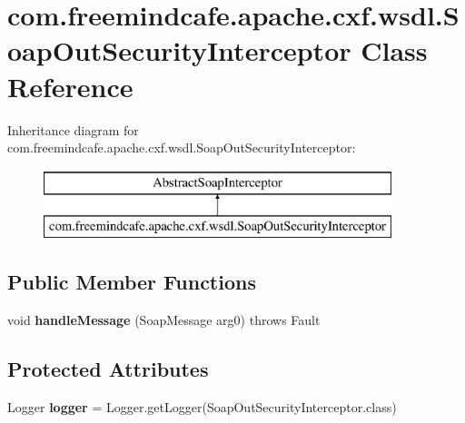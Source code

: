 \hypertarget{classcom_1_1freemindcafe_1_1apache_1_1cxf_1_1wsdl_1_1_soap_out_security_interceptor}{}\section{com.\+freemindcafe.\+apache.\+cxf.\+wsdl.\+Soap\+Out\+Security\+Interceptor Class Reference}
\label{classcom_1_1freemindcafe_1_1apache_1_1cxf_1_1wsdl_1_1_soap_out_security_interceptor}
Inheritance diagram for com.\+freemindcafe.\+apache.\+cxf.\+wsdl.\+Soap\+Out\+Security\+Interceptor\+:\begin{figure}[H]
\begin{center}
\leavevmode
\includegraphics[height=2.000000cm]{classcom_1_1freemindcafe_1_1apache_1_1cxf_1_1wsdl_1_1_soap_out_security_interceptor}
\end{center}
\end{figure}
\subsection*{Public Member Functions}
\begin{DoxyCompactItemize}
\item 
\hypertarget{classcom_1_1freemindcafe_1_1apache_1_1cxf_1_1wsdl_1_1_soap_out_security_interceptor_aa170f13104a26169f22a6dc425e2ca5d}{}void {\bfseries handle\+Message} (Soap\+Message arg0)  throws Fault \label{classcom_1_1freemindcafe_1_1apache_1_1cxf_1_1wsdl_1_1_soap_out_security_interceptor_aa170f13104a26169f22a6dc425e2ca5d}

\end{DoxyCompactItemize}
\subsection*{Protected Attributes}
\begin{DoxyCompactItemize}
\item 
\hypertarget{classcom_1_1freemindcafe_1_1apache_1_1cxf_1_1wsdl_1_1_soap_out_security_interceptor_a145172575e1da2cfa8e0f84b122354c5}{}Logger {\bfseries logger} = Logger.\+get\+Logger(Soap\+Out\+Security\+Interceptor.\+class)\label{classcom_1_1freemindcafe_1_1apache_1_1cxf_1_1wsdl_1_1_soap_out_security_interceptor_a145172575e1da2cfa8e0f84b122354c5}

\end{DoxyCompactItemize}


